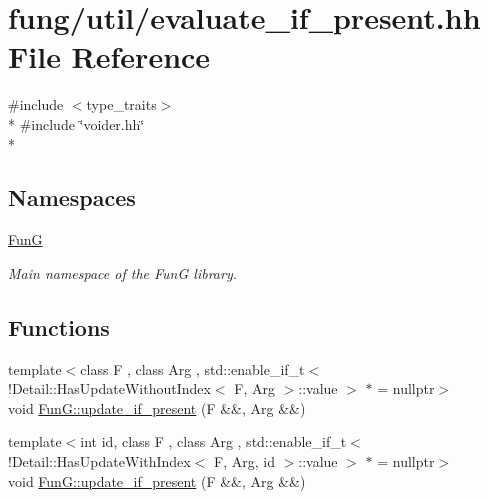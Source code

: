 \hypertarget{evaluate__if__present_8hh}{\section{fung/util/evaluate\-\_\-if\-\_\-present.hh File Reference}
\label{evaluate__if__present_8hh}
}
{\ttfamily \#include $<$type\-\_\-traits$>$}\\*
{\ttfamily \#include \char`\"{}voider.\-hh\char`\"{}}\\*
\subsection*{Namespaces}
\begin{DoxyCompactItemize}
\item 
\hyperlink{namespaceFunG}{Fun\-G}
\begin{DoxyCompactList}\small\item\em Main namespace of the Fun\-G library. \end{DoxyCompactList}\end{DoxyCompactItemize}
\subsection*{Functions}
\begin{DoxyCompactItemize}
\item 
{\footnotesize template$<$class F , class Arg , std\-::enable\-\_\-if\-\_\-t$<$!\-Detail\-::\-Has\-Update\-Without\-Index$<$ F, Arg $>$\-::value $>$ $\ast$  = nullptr$>$ }\\void \hyperlink{namespaceFunG_a3b9d2e5d07b30c2ee26703b33e9adb9e}{Fun\-G\-::update\-\_\-if\-\_\-present} (F \&\&, Arg \&\&)
\item 
{\footnotesize template$<$int id, class F , class Arg , std\-::enable\-\_\-if\-\_\-t$<$!\-Detail\-::\-Has\-Update\-With\-Index$<$ F, Arg, id $>$\-::value $>$ $\ast$  = nullptr$>$ }\\void \hyperlink{namespaceFunG_aed5ddbef97c98202e818bca2b74c75d2}{Fun\-G\-::update\-\_\-if\-\_\-present} (F \&\&, Arg \&\&)
\end{DoxyCompactItemize}
